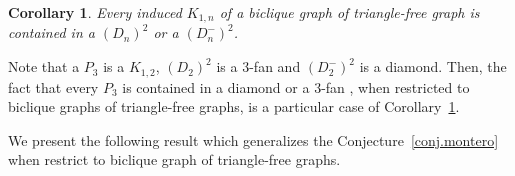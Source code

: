 \documentclass{article}
\newtheorem{corollary}{Corollary}
\begin{document}
\begin{corollary}\label{cor.DnKB}
  Every induced $K_{1,n}$ of a biclique  graph of triangle-free graph is
  contained in a $(D_n)^2$ or a $(D^-_ n)^2$.
\end{corollary}

Note that a $P_3$ is a $K_{1,2}$, $(D_2)^2$ is a $3$-fan and $(D^-_2)^2$
is a diamond. Then, the fact that  every $P_3$ is contained in a diamond
or  a  $3$-fan  \cite{Groshaus2010}, when restricted to biclique graphs of triangle-free graphs,
is  a particular case of Corollary~\ref{cor.DnKB}.


We present the following result which generalizes the Conjecture~\ref{conj.montero} when restrict to biclique graph of triangle-free graphs.
\end{document}
